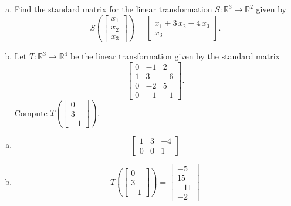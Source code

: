 
\begin{exerciseStatement}

\begin{enumerate}[(a)]
\item Find the standard matrix for the linear transformation \(S:\mathbb{R}^ 3  \to \mathbb{R}^ 2 \) given by \[S\left(  \left[\begin{array}{c}
x_{1} \\
x_{2} \\
x_{3}
\end{array}\right]  \right) =  \left[\begin{array}{c}
x_{1} + 3 \, x_{2} - 4 \, x_{3} \\
x_{3}
\end{array}\right] .\]
\item Let \(T:\mathbb{R}^ 3  \to \mathbb{R}^ 4 \) be the linear transformation given by the standard matrix \[ \left[\begin{array}{ccc}
0 & -1 & 2 \\
1 & 3 & -6 \\
0 & -2 & 5 \\
0 & -1 & -1
\end{array}\right] .\] Compute \(T\left( \left[\begin{array}{c}
0 \\
3 \\
-1
\end{array}\right]  \right)\). 
\end{enumerate}
    
\end{exerciseStatement}
    
\begin{exerciseAnswer} 

\begin{enumerate}[(a)]
\item \[ \left[\begin{array}{ccc}
1 & 3 & -4 \\
0 & 0 & 1
\end{array}\right] \]
\item \[T\left( \left[\begin{array}{c}
0 \\
3 \\
-1
\end{array}\right]  \right)= \left[\begin{array}{c}
-5 \\
15 \\
-11 \\
-2
\end{array}\right] \]
\end{enumerate}
    
\end{exerciseAnswer}
    
